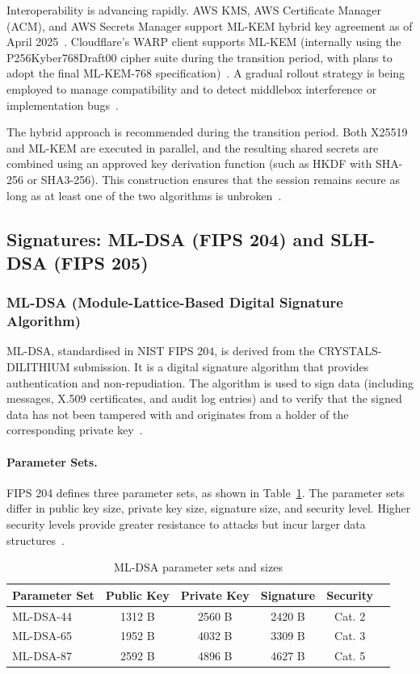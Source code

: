 \documentclass[12pt,a4paper]{article}
\begin{document}
Interoperability is advancing rapidly. AWS KMS, AWS Certificate Manager (ACM), and AWS Secrets Manager support ML-KEM hybrid key agreement as of April 2025~\cite{aws-mlkem-deployment-2025}. Cloudflare's WARP client supports ML-KEM (internally using the P256Kyber768Draft00 cipher suite during the transition period, with plans to adopt the final ML-KEM-768 specification)~\cite{cloudflare-warp-pqc-2025}. A gradual rollout strategy is being employed to manage compatibility and to detect middlebox interference or implementation bugs~\cite{cloudflare-warp-pqc-2025}.

The hybrid approach is recommended during the transition period. Both X25519 and ML-KEM are executed in parallel, and the resulting shared secrets are combined using an approved key derivation function (such as HKDF with SHA-256 or SHA3-256). This construction ensures that the session remains secure as long as at least one of the two algorithms is unbroken~\cite{nist-sp800-227-2024}.

\subsection{Signatures: ML-DSA (FIPS 204) and SLH-DSA (FIPS 205)}

\subsubsection{ML-DSA (Module-Lattice-Based Digital Signature Algorithm)}

ML-DSA, standardised in NIST FIPS 204, is derived from the CRYSTALS-DILITHIUM submission. It is a digital signature algorithm that provides authentication and non-repudiation. The algorithm is used to sign data (including messages, X.509 certificates, and audit log entries) and to verify that the signed data has not been tampered with and originates from a holder of the corresponding private key~\cite{nist-fips-204-2024}.

\paragraph{Parameter Sets.}
FIPS 204 defines three parameter sets, as shown in Table~\ref{tab:mldsa-params}. The parameter sets differ in public key size, private key size, signature size, and security level. Higher security levels provide greater resistance to attacks but incur larger data structures~\cite{nist-fips-204-2024}.

\begin{table}[htbp]
\centering
\caption{ML-DSA parameter sets and sizes}
\label{tab:mldsa-params}
\begin{tabular}{lccccc}
\toprule
\textbf{Parameter Set} & \textbf{Public Key} & \textbf{Private Key} & \textbf{Signature} & \textbf{Security} \\
\midrule
ML-DSA-44 & 1312 B & 2560 B & 2420 B & Cat. 2 \\
ML-DSA-65 & 1952 B & 4032 B & 3309 B & Cat. 3 \\
ML-DSA-87 & 2592 B & 4896 B & 4627 B & Cat. 5 \\
\bottomrule
\end{tabular}
\end{table}
\end{document}
